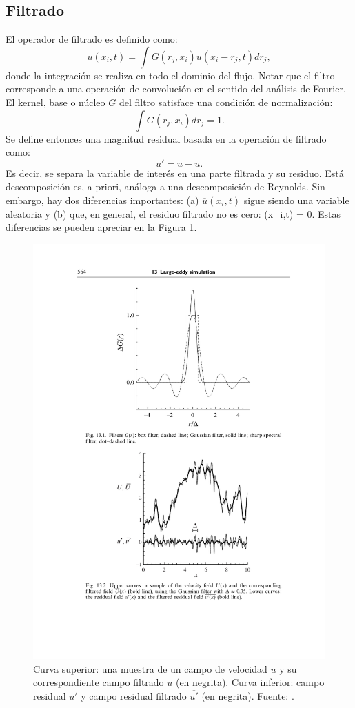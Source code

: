 \subsection{Filtrado}
El operador de filtrado es definido como:
\begin{equation}
\overline{u}(x_i,t) = \int G(r_j,x_i) u(x_i-r_j,t)dr_j,
\end{equation}
donde la integración se realiza en todo el dominio del flujo. Notar que el filtro corresponde a una operación de convolución en el sentido del análisis de Fourier. El kernel, base o núcleo $G$ del filtro satisface una condición de normalización:
\begin{equation}
\int G(r_j,x_i)dr_j = 1.
\end{equation}
Se define entonces una magnitud residual basada en la operación de filtrado como:
\begin{equation}
u' = u - \overline{u}.
\end{equation}
Es decir, se separa la variable de interés en una parte filtrada y su residuo. Está descomposición es, a priori, análoga a una descomposición de Reynolds. Sin embargo, hay dos diferencias importantes: (a) $\overline{u}(x_i,t)$ sigue siendo una variable aleatoria y (b) que, en general, el residuo filtrado no es cero:
\be {}(x_i,t) \not= 0. \ee
Estas diferencias se pueden apreciar en la Figura \ref{fig:03_les}.
\begin{figure}[h!]
	\centering
	\includegraphics[width=0.6\linewidth,trim={4.8cm 4.8cm 2.8cm 12.1cm},clip]{Imagenes/03/les}
	\caption{Curva superior: una muestra de un campo de velocidad $u$ y su correspondiente campo filtrado $\overline{u}$ (en negrita). Curva inferior: campo residual $u'$ y campo residual filtrado $\overline{u'}$ (en negrita). Fuente: \cite{pope2000turbulent}.}
	\label{fig:03_les}
\end{figure}

